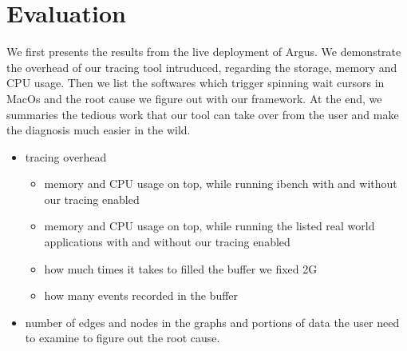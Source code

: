 \section{Evaluation}
We first presents the results from the live deployment of Argus.
We demonstrate the overhead of our tracing tool intruduced, regarding the storage, memory and CPU usage.
Then we list the softwares which trigger spinning wait cursors in MacOs and the root cause we figure out with our framework.
At the end, we summaries the tedious work that our tool can take over from the user and make the diagnosis much easier in the wild.

\begin{itemize}
\item tracing overhead
	\begin{itemize}
	\item memory and CPU usage on top, while running ibench with and without our tracing enabled
	\item memory and CPU usage on top, while running the listed real world applications with and without our tracing enabled
	\item how much times it takes to filled the buffer we fixed 2G
	\item how many events recorded in the buffer
	\end{itemize}
\item number of edges and nodes in the graphs and portions of data the user need to examine to figure out the root cause.
\end{itemize}
